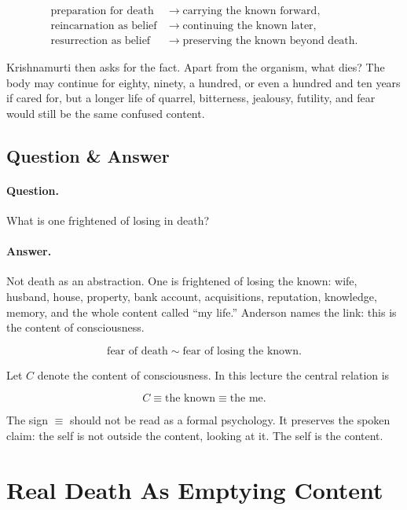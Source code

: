 \documentclass[11pt,oneside]{book}
\begin{document}
\begin{align}
\text{preparation for death} &\longrightarrow \text{carrying the known forward},\\
\text{reincarnation as belief} &\longrightarrow \text{continuing the known later},\\
\text{resurrection as belief} &\longrightarrow \text{preserving the known beyond death}.
\end{align}

Krishnamurti then asks for the fact. Apart from the organism, what dies? The body may continue for eighty, ninety, a hundred, or even a hundred and ten years if cared for, but a longer life of quarrel, bitterness, jealousy, futility, and fear would still be the same confused content.

\subsection{Question \& Answer}

\paragraph{Question.}
What is one frightened of losing in death?

\paragraph{Answer.}
Not death as an abstraction. One is frightened of losing the known: wife, husband, house, property, bank account, acquisitions, reputation, knowledge, memory, and the whole content called ``my life.'' Anderson names the link: this is the content of consciousness.

\begin{equation}
\text{fear of death}
\sim
\text{fear of losing the known}.
\end{equation}

Let \(C\) denote the content of consciousness. In this lecture the central relation is

\begin{equation}
C \equiv \text{the known} \equiv \text{the me}.
\end{equation}

The sign \(\equiv\) should not be read as a formal psychology. It preserves the spoken claim: the self is not outside the content, looking at it. The self is the content.

\section{Real Death As Emptying Content}
\end{document}
